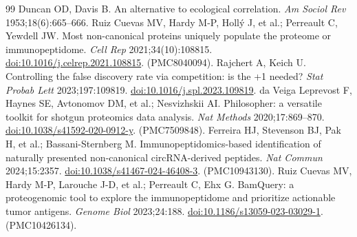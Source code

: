 \begin{thebibliography}{99}
 Duncan OD, Davis B. An alternative to ecological correlation. \emph{Am Sociol Rev} 1953;18(6):665--666.
 Ruiz Cuevas MV, Hardy M-P, Holl\'y J, et al.; Perreault C, Yewdell JW. Most non-canonical proteins uniquely populate the proteome or immunopeptidome. \emph{Cell Rep} 2021;34(10):108815. \href{https://doi.org/10.1016/j.celrep.2021.108815}{doi:10.1016/j.celrep.2021.108815}. (PMC8040094).
 Rajchert A, Keich U. Controlling the false discovery rate via competition: is the +1 needed? \emph{Stat Probab Lett} 2023;197:109819. \href{https://doi.org/10.1016/j.spl.2023.109819}{doi:10.1016/j.spl.2023.109819}.
 da Veiga Leprevost F, Haynes SE, Avtonomov DM, et al.; Nesvizhskii AI. Philosopher: a versatile toolkit for shotgun proteomics data analysis. \emph{Nat Methods} 2020;17:869--870. \href{https://doi.org/10.1038/s41592-020-0912-y}{doi:10.1038/s41592-020-0912-y}. (PMC7509848).
 Ferreira HJ, Stevenson BJ, Pak H, et al.; Bassani-Sternberg M. Immunopeptidomics-based identification of naturally presented non-canonical circRNA-derived peptides. \emph{Nat Commun} 2024;15:2357. \href{https://doi.org/10.1038/s41467-024-46408-3}{doi:10.1038/s41467-024-46408-3}. (PMC10943130).
 Ruiz Cuevas MV, Hardy M-P, Larouche J-D, et al.; Perreault C, Ehx G. BamQuery: a proteogenomic tool to explore the immunopeptidome and prioritize actionable tumor antigens. \emph{Genome Biol} 2023;24:188. \href{https://doi.org/10.1186/s13059-023-03029-1}{doi:10.1186/s13059-023-03029-1}. (PMC10426134).
\end{thebibliography}
